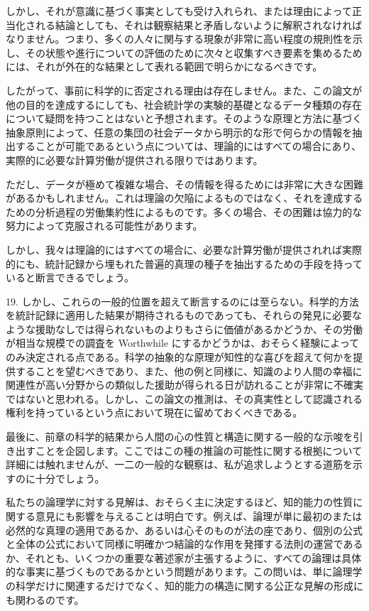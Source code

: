 \documentclass[a4paper,11pt,openany]{ltjsbook}
\begin{document}
しかし、それが意識に基づく事実としても受け入れられ、または理由によって正当化される結論としても、それは観察結果と矛盾しないように解釈されなければなりません。つまり、多くの人々に関与する現象が非常に高い程度の規則性を示し、その状態や進行についての評価のために次々と収集すべき要素を集めるためには、それが外在的な結果として表れる範囲で明らかになるべきです。

したがって、事前に科学的に否定される理由は存在しません。また、この論文が他の目的を達成するにしても、社会統計学の実験的基礎となるデータ種類の存在について疑問を持つことはないと予想されます。そのような原理と方法に基づく抽象原則によって、任意の集団の社会データから明示的な形で何らかの情報を抽出することが可能であるという点については、理論的にはすべての場合にあり、実際的に必要な計算労働が提供される限りではあります。

ただし、データが極めて複雑な場合、その情報を得るためには非常に大きな困難があるかもしれません。これは理論の欠陥によるものではなく、それを達成するための分析過程の労働集約性によるものです。多くの場合、その困難は協力的な努力によって克服される可能性があります。

しかし、我々は理論的にはすべての場合に、必要な計算労働が提供されれば実際的にも、統計記録から埋もれた普遍的真理の種子を抽出するための手段を持っていると断言できるでしょう。

19. しかし、これらの一般的位置を超えて断言するのには至らない。科学的方法を統計記録に適用した結果が期待されるものであっても、それらの発見に必要なような援助なしでは得られないものよりもさらに価値があるかどうか、その労働が相当な規模での調査を Worthwhile にするかどうかは、おそらく経験によってのみ決定される点である。科学の抽象的な原理が知性的な喜びを超えて何かを提供することを望むべきであり、また、他の例と同様に、知識のより人間の幸福に関連性が高い分野からの類似した援助が得られる日が訪れることが非常に不確実ではないと思われる。しかし、この論文の推測は、その真実性として認識される権利を持っているという点において現在に留めておくべきである。

最後に、前章の科学的結果から人間の心の性質と構造に関する一般的な示唆を引き出すことを企図します。ここではこの種の推論の可能性に関する根拠について詳細には触れませんが、一二の一般的な観察は、私が追求しようとする道筋を示すのに十分でしょう。

私たちの論理学に対する見解は、おそらく主に決定するほど、知的能力の性質に関する意見にも影響を与えることは明白です。例えば、論理が単に最初のまたは必然的な真理の適用であるか、あるいは心そのものが法の座であり、個別の公式と全体の公式において同様に明確かつ結論的な作用を発揮する法則の運営であるか、それとも、いくつかの重要な著述家が主張するように、すべての論理は具体的な事実に基づくものであるかという問題があります。この問いは、単に論理学の科学だけに関連するだけでなく、知的能力の構造に関する公正な見解の形成にも関わるのです。
\end{document}
